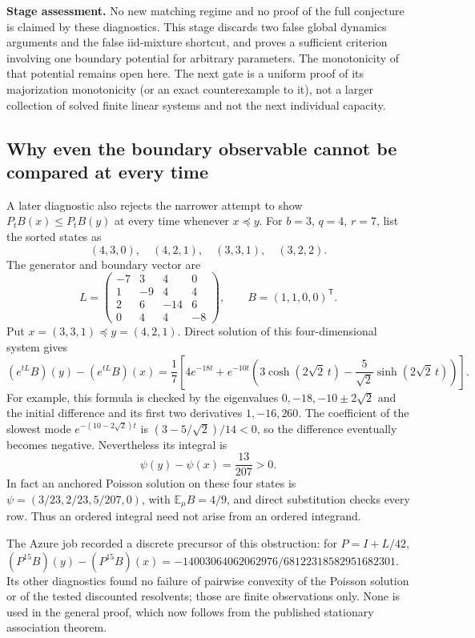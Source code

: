 \documentclass[11pt]{article}
\begin{document}
\noindent\textbf{Stage assessment.}
No new matching regime and no proof of the full conjecture is claimed
by these diagnostics. This stage discards two false global dynamics
arguments and the false iid-mixture shortcut, and proves a sufficient
criterion involving one boundary potential for arbitrary parameters.
The monotonicity of that potential remains open here. The next gate
is a uniform proof of its majorization monotonicity (or an exact
counterexample to it), not a larger collection of solved finite
linear systems and not the next individual capacity.

\subsection{Why even the boundary observable cannot be compared at every time}
A later diagnostic also rejects the narrower attempt to show
$P_tB(x)\leq P_tB(y)$ at every time whenever $x\preceq y$.
For $b=3$, $q=4$, $r=7$, list the sorted states as
\[
 (4,3,0),\quad (4,2,1),\quad (3,3,1),\quad (3,2,2).
\]
The generator and boundary vector are
\[
 L=\begin{pmatrix}
 -7&3&4&0\\1&-9&4&4\\2&6&-14&6\\0&4&4&-8
 \end{pmatrix},\qquad B=(1,1,0,0)^{\mathsf T}.
\]
Put $x=(3,3,1)\preceq y=(4,2,1)$. Direct solution of this
four-dimensional system gives
\[
 (e^{tL}B)(y)-(e^{tL}B)(x)
 =\frac17\left[4e^{-18t}+e^{-10t}
 \left(3\cosh(2\sqrt2\,t)-\frac5{\sqrt2}\sinh(2\sqrt2\,t)\right)\right].
\]
For example, this formula is checked by the eigenvalues
$0,-18,-10\pm2\sqrt2$ and the initial difference and its first
two derivatives $1,-16,260$. The coefficient of the slowest mode
$e^{-(10-2\sqrt2)t}$ is $(3-5/\sqrt2)/14<0$, so the difference
eventually becomes negative. Nevertheless its integral is
\[
 \psi(y)-\psi(x)=\frac{13}{207}>0.
\]
In fact an anchored Poisson solution on these four states is
$\psi=(3/23,2/23,5/207,0)$, with
$\mathbb E_\mu B=4/9$, and direct substitution checks every row.
Thus an ordered integral need not arise from an ordered integrand.

The Azure job recorded a discrete precursor of this obstruction:
for $P=I+L/42$, $(P^{15}B)(y)-(P^{15}B)(x)
=-14003064062062976/68122318582951682301$.
Its other diagnostics found no failure of pairwise convexity of the
Poisson solution or of the tested discounted resolvents; those are
finite observations only. None is used in the general proof, which
now follows from the published stationary association theorem.
\end{document}
